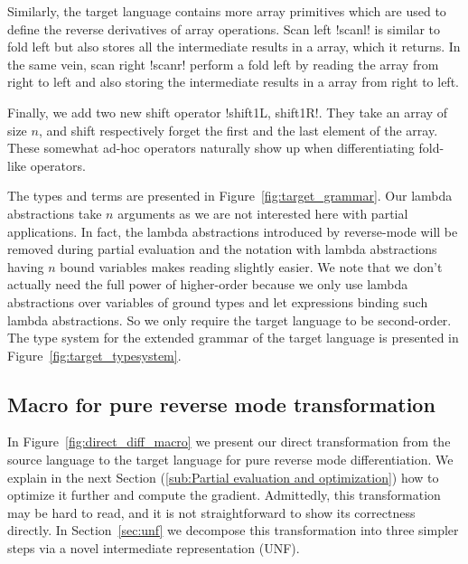 Similarly, the target language contains more array primitives which are used to define the reverse derivatives of array operations. 
Scan left !scanl! is similar to fold left but also stores all the intermediate results in a array, which it returns.
In the same vein, scan right !scanr! perform a fold left by reading the array from right to left and also storing 
the intermediate results in a array from right to left.

Finally, we add two new shift operator !shift1L, shift1R!. 
They take an array of size $n$, and shift respectively forget the first and the last element of the array.
These somewhat ad-hoc operators naturally show up when differentiating fold-like operators.

The types and terms are presented in Figure~\ref{fig:target_grammar}.
Our lambda abstractions take $n$ arguments as we are not interested here with partial applications. 
In fact, the lambda abstractions introduced by reverse-mode will be removed during partial evaluation 
and the notation with lambda abstractions having $n$ bound variables makes reading slightly easier.
We note that we don't actually need the full power of higher-order because we only use lambda abstractions over variables of ground types
and let expressions binding such lambda abstractions. So we only require the target language to be second-order.
The type system for the extended grammar of the target language is presented in Figure~\ref{fig:target_typesystem}. 





\subsection{Macro for pure reverse mode transformation} %
\label{sub:Macro for pure reverse mode transformation}

In Figure~\ref{fig:direct_diff_macro} we present our direct transformation from the source language to the target language for pure reverse mode differentiation.
We explain in the next Section (\ref{sub:Partial evaluation and optimization}) how to optimize it further and compute the gradient.
Admittedly, this transformation may be hard to read, and it is not straightforward to show its correctness directly. 
In Section~\ref{sec:unf} we decompose this transformation into three simpler steps via a novel intermediate representation (UNF).


